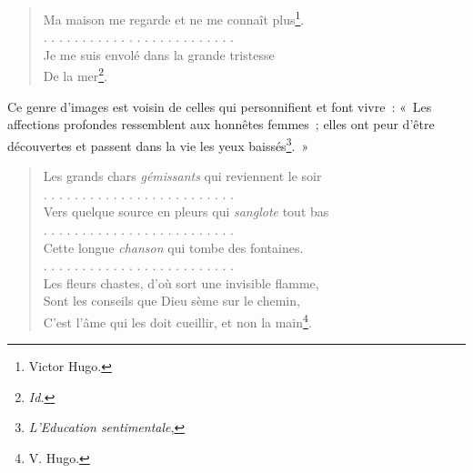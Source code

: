 \documentclass[french,twoside]{book} %
\begin{document}
\begin{verse}
Ma maison me regarde et ne me connaît plus\footnote{Victor Hugo.}.\\
. . . . . . . . . . . . . . . . . . . . . . . . .\\
Je me suis envolé dans la grande tristesse\\
De la mer\footnote{\emph{Id.}}.\\
\end{verse}

\noindent Ce genre d’images est voisin de celles qui personnifient et font vivre : « Les affections profondes ressemblent aux honnêtes femmes ; elles ont peur d’être découvertes et passent dans la vie les yeux baissés\footnote{\emph{L’Education sentimentale},}. »\par


\begin{verse}
Les grands chars \emph{gémissants} qui reviennent le soir\\
. . . . . . . . . . . . . . . . . . . . . . . . .\\
Vers quelque source en pleurs qui \emph{sanglote} tout bas\\
. . . . . . . . . . . . . . . . . . . . . . . . .\\
Cette longue \emph{chanson} qui tombe des fontaines.\\
. . . . . . . . . . . . . . . . . . . . . . . . .\\
Les fleurs chastes, d’où sort une invisible flamme,\\
Sont les conseils que Dieu sème sur le chemin,\\
C’est l’âme qui les doit cueillir, et non la main\footnote{V. Hugo.}.\\
\end{verse}
\end{document}
